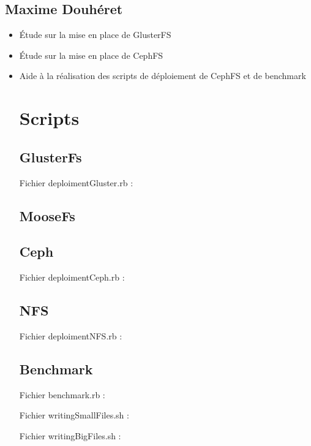 \documentclass[12pt]{report}
\begin{document}
                        \section{Maxime Douhéret}
                                \begin{itemize}
                                        \item Étude sur la mise en place de GlusterFS
                                        \item Étude sur la mise en place de CephFS
                                        \item Aide à la réalisation des scripts de déploiement de CephFS et de benchmark

		\chapter{Scripts}
			\section{GlusterFs}
				Fichier deploimentGluster.rb :
				
			\section{MooseFs}
			\section{Ceph}
				Fichier deploimentCeph.rb :
				
			\section{NFS}
				Fichier deploimentNFS.rb :
				
			\section{Benchmark}
				Fichier benchmark.rb :
				

				Fichier writingSmallFiles.sh :
				

				Fichier writingBigFiles.sh :
				


\end{itemize}
\end{document}
